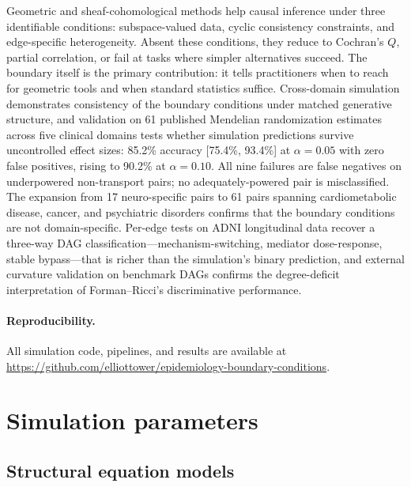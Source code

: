 \documentclass{article}
\begin{document}
Geometric and sheaf-cohomological methods help causal inference under three identifiable conditions: subspace-valued data, cyclic consistency constraints, and edge-specific heterogeneity.
Absent these conditions, they reduce to Cochran's $Q$, partial correlation, or fail at tasks where simpler alternatives succeed.
The boundary itself is the primary contribution: it tells practitioners when to reach for geometric tools and when standard statistics suffice.
Cross-domain simulation demonstrates consistency of the boundary conditions under matched generative structure, and validation on 61 published Mendelian randomization estimates across five clinical domains tests whether simulation predictions survive uncontrolled effect sizes: 85.2\% accuracy [75.4\%, 93.4\%] at $\alpha = 0.05$ with zero false positives, rising to 90.2\% at $\alpha = 0.10$.
All nine failures are false negatives on underpowered non-transport pairs; no adequately-powered pair is misclassified.
The expansion from 17 neuro-specific pairs to 61 pairs spanning cardiometabolic disease, cancer, and psychiatric disorders confirms that the boundary conditions are not domain-specific.
Per-edge tests on ADNI longitudinal data recover a three-way DAG classification---mechanism-switching, mediator dose-response, stable bypass---that is richer than the simulation's binary prediction, and external curvature validation on benchmark DAGs confirms the degree-deficit interpretation of Forman--Ricci's discriminative performance.

\paragraph{Reproducibility.}
All simulation code, pipelines, and results are available at \url{https://github.com/elliottower/epidemiology-boundary-conditions}.




\appendix

\section{Simulation parameters}
\label{app:sim-params}

\subsection{Structural equation models}
\end{document}
